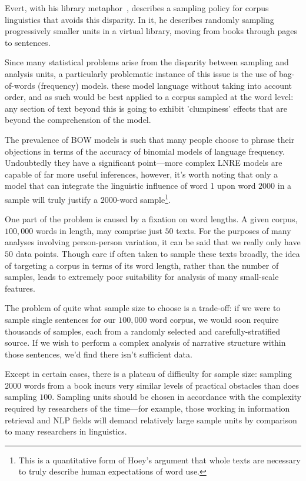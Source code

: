 Evert, with his library metaphor~\cite{evert2006random}, describes a sampling policy for corpus linguistics that avoids this disparity.  In it, he describes randomly sampling progressively smaller units in a virtual library, moving from books through pages to sentences.%

Since many statistical problems arise from the disparity between sampling and analysis units, a particularly problematic instance of this issue is the use of bag-of-words (frequency) models.  these model language without taking into account order, and as such would be best applied to a corpus sampled at the word level: any section of text beyond this is going to exhibit 'clumpiness' effects that are beyond the comprehension of the model.

The prevalence of BOW models is such that many people choose to phrase their objections in terms of the accuracy of binomial models of language frequency\cite{kilgarriff2005language,evert2004simple,evert2007zipfr}.  Undoubtedly they have a significant point---more complex LNRE models are capable of far more useful inferences, however, it's worth noting that only a model that can integrate the linguistic influence of word 1 upon word $2000$ in a sample will truly justify a $2000$-word sample\footnote{This is a quantitative form of Hoey's argument that whole texts are necessary to truly describe human expectations of word use.}.


One part of the problem is caused by a fixation on word lengths. A given corpus, $100,000$ words in length, may comprise just $50$ texts. For the purposes of many analyses involving person-person variation, it can be said that we really only have $50$ data points. Though care if often taken to sample these texts broadly, the idea of targeting a corpus in terms of its word length, rather than the number of samples, leads to extremely poor suitability for analysis of many small-scale features.

The problem of quite what sample size to choose is a trade-off: if we were to sample single sentences for our $100,000$ word corpus, we would soon require thousands of samples, each from a randomly selected and carefully-stratified source. If we wish to perform a complex analysis of narrative structure within those sentences, we'd find there isn't sufficient data.

Except in certain cases, there is a plateau of difficulty for sample size: sampling $2000$ words from a book incurs very similar levels of practical obstacles than does sampling $100$. Sampling units should be chosen in accordance with the complexity required by researchers of the time---for example, those working in information retrieval and NLP fields will demand relatively large sample units by comparison to many researchers in linguistics.

